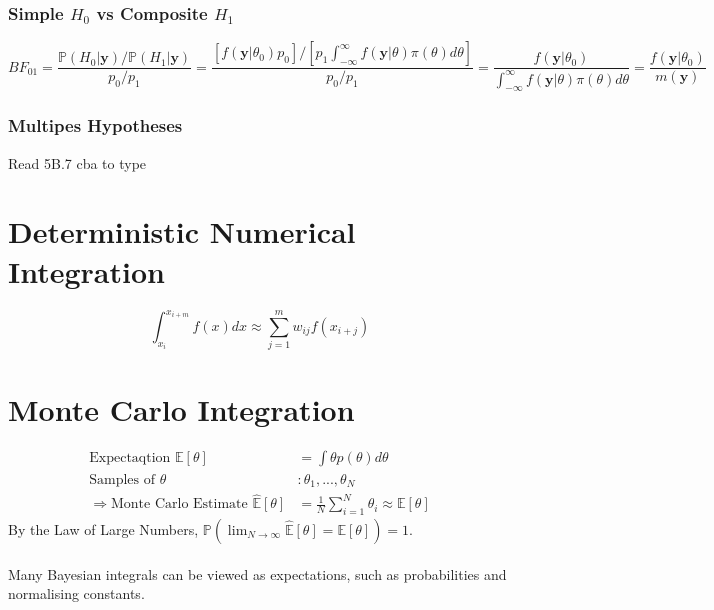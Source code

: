 \documentclass[12pt]{article}
\theoremstyle{definition}
\newcommand{\Prob}[1]{\mathbb{P}(#1)}
\newcommand{\Expect}[1]{\mathbb{E}\left[#1\right]}
\begin{document}
    \subsubsection*{Simple $H_0$ vs Composite $H_1$}
    $$BF_{01} = \frac{\Prob{H_0|\bm{y}}/\Prob{H_1|\bm{y}}}{p_0/p_1} = \frac{\left[ f(\bm{y}|\theta_0)p_0 \right]/ \left[ p_1 \int_{-\infty}^\infty f(\bm{y}|\theta)\pi(\theta) d\theta \right]}{p_0/p_1} = \frac{f(\bm{y}|\theta_0)}{\int_{-\infty}^\infty f(\bm{y}|\theta)\pi(\theta)d\theta} = \frac{f(\bm{y}|\theta_0)}{m(\bm{y})}$$
    \subsubsection*{Multipes Hypotheses}
    Read 5B.7 cba to type

\section{Deterministic Numerical Integration}
$$\int_{x_i}^{x_{i+m}} f(x) dx \approx \sum_{j=1}^m w_{ij} f(x_{i+j})$$

\newpage
\section{Monte Carlo Integration}
\begin{align*}
    \text{Expectaqtion }\Expect{\theta} &= \int\theta p(\theta) d\theta\\
    \text{Samples of } \theta &: \theta_1,...,\theta_N\\
    \Rightarrow \text{Monte Carlo Estimate } \hat{\mathbb{E}}[\theta] &= \frac{1}{N}\sum_{i=1}^N \theta_i \approx \Expect{\theta}
\end{align*}
By the Law of Large Numbers, $\Prob{\lim_{N \rightarrow \infty} \hat{\mathbb{E}}\left[\theta\right] = \Expect{\theta}} = 1$.
\\~\\
Many Bayesian integrals can be viewed as expectations, such as probabilities and normalising constants.
\end{document}
